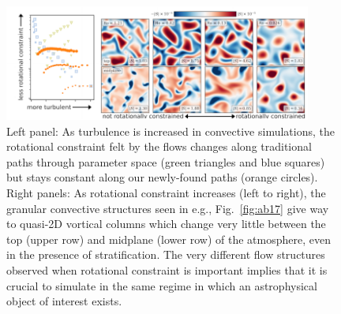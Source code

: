 \documentclass[preprint, hmargin=1in, vmargin=1in]{aastex62}
\begin{document}
\begin{figure}[t]
	\begin{center}
    \includegraphics[width=0.9\textwidth]{./figs/rossby_plot.pdf}
	\end{center}
	\vspace{-22pt}
    \caption{ 
	\citep[From Figs.~1 \& 2 of][]{anders&brown2017} Left panel: As turbulence is increased in convective simulations, the rotational constraint felt by the flows changes along traditional paths through parameter space (green triangles and blue squares) but stays constant along our newly-found paths (orange circles).
	Right panels: As rotational constraint increases (left to right), the granular convective structures seen in e.g., Fig.~\ref{fig:ab17} give way to quasi-2D vortical columns which change very little between the top (upper row) and midplane (lower row) of the atmosphere, even in the presence of stratification.
	The very different flow structures observed when rotational constraint is important implies that it is crucial to simulate in the same regime in which an astrophysical object of interest exists.
	\label{fig:rossby_plot} }
	\vspace{-11pt}
\end{figure}

\vspace{-11pt}
\end{document}
